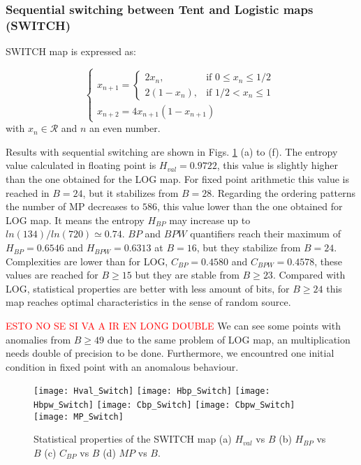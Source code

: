 \subsubsection{Sequential switching between Tent and Logistic maps (SWITCH)} \label{sssec:switch}

SWITCH map is expressed as:

\begin{equation}
\begin{cases}
	x_{n+1}=
	\begin{cases}
		2x_n, & \mbox{if } 0\leq x_n\leq 1/2 \\
		2(1-x_n ), & \mbox{if } 1/2<x_n\leq 1
	\end{cases} \\
	x_{n+2}=4x_{n+1}(1-x_{n+1})
\end{cases}
\end{equation}
with $x_n\in\mathcal{R}$ and $n$ an even number.

Results with sequential switching are shown in Figs. \ref{fig:SWITCH_QuantiB} (a) to (f).
The entropy value calculated in floating point is $H_{val}=0.9722$, this value is slightly higher than the one obtained for the LOG map. 
For fixed point arithmetic this value is reached in $B=24$, but it stabilizes from $B=28$.
Regarding the ordering patterns the number of MP decreases to $586$, this value lower than the one obtained for LOG map.
It means the entropy $H_{BP}$ may increase up to $ln(134)/ln(720)\simeq 0.74$.
$BP$ and $BPW$ quantifiers reach their maximum of $H_{BP}=0.6546$ and $H_{BPW}=0.6313$ at $B=16$, but they stabilize from $B=24$.
Complexities are lower than for LOG, $C_{BP}=0.4580$ and $C_{BPW}=0.4578$, these values are reached for $B \geq 15$ but they are stable from $B \geq 23$.
Compared with LOG, statistical properties are better with less amount of bits, for $B \geq 24$ this map reaches optimal characteristics in the sense of random source.

\textcolor{red}{ESTO NO SE SI VA A IR EN LONG DOUBLE}
We can see some points with anomalies from $B \geq 49$ due to the same problem of LOG map, an multiplication needs double of precision to be done.
Furthermore, we encountred one initial condition in fixed point with an anomalous behaviour.

\begin{figure}
	\texttt{[image: Hval\_Switch]}
	\texttt{[image: Hbp\_Switch]}
	\texttt{[image: Hbpw\_Switch]}
	\texttt{[image: Cbp\_Switch]}
	\texttt{[image: Cbpw\_Switch]}
	\texttt{[image: MP\_Switch]}
	\caption{Statistical properties of the SWITCH map (a) $H_{val}$ vs $B$ (b) $H_{BP}$ vs $B$ (c) $C_{BP}$ vs $B$ (d) $MP$ vs $B$.}
	\label{fig:SWITCH_QuantiB}
\end{figure}


